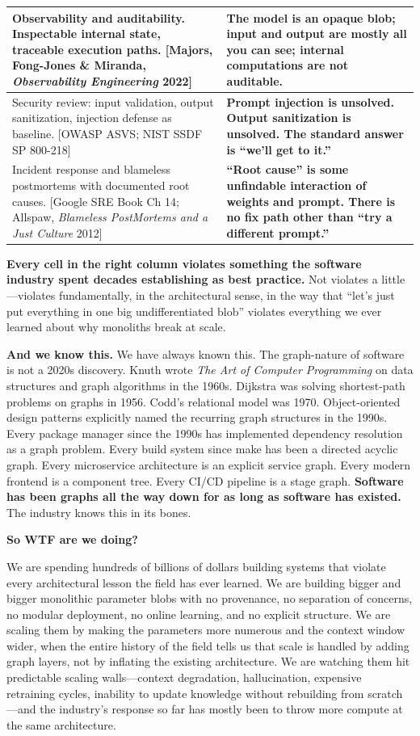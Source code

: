 \documentclass[11pt]{article}
\begin{document}
\begin{longtable}{|p{}|p{}|}
\hline
Observability and auditability. Inspectable internal state, traceable execution paths. [Majors, Fong-Jones \& Miranda, \emph{Observability Engineering} 2022] & \textbf{The model is an opaque blob; input and output are mostly all you can see; internal computations are not auditable.} \\
\hline
Security review: input validation, output sanitization, injection defense as baseline. [OWASP ASVS; NIST SSDF SP 800-218] & \textbf{Prompt injection is unsolved. Output sanitization is unsolved. The standard answer is ``we'll get to it.''} \\
\hline
Incident response and blameless postmortems with documented root causes. [Google SRE Book Ch 14; Allspaw, \emph{Blameless PostMortems and a Just Culture} 2012] & \textbf{``Root cause'' is some unfindable interaction of weights and prompt. There is no fix path other than ``try a different prompt.''} \\
\hline
\end{longtable}

\textbf{Every cell in the right column violates something the software industry spent decades establishing as best practice.} Not violates a little---violates fundamentally, in the architectural sense, in the way that ``let's just put everything in one big undifferentiated blob'' violates everything we ever learned about why monoliths break at scale.

\textbf{And we know this.} We have always known this. The graph-nature of software is not a 2020s discovery. Knuth wrote \emph{The Art of Computer Programming} on data structures and graph algorithms in the 1960s. Dijkstra was solving shortest-path problems on graphs in 1956. Codd's relational model was 1970. Object-oriented design patterns explicitly named the recurring graph structures in the 1990s. Every package manager since the 1990s has implemented dependency resolution as a graph problem. Every build system since make has been a directed acyclic graph. Every microservice architecture is an explicit service graph. Every modern frontend is a component tree. Every CI/CD pipeline is a stage graph. \textbf{Software has been graphs all the way down for as long as software has existed.} The industry knows this in its bones.

\textbf{So WTF are we doing?}

We are spending hundreds of billions of dollars building systems that violate every architectural lesson the field has ever learned. We are building bigger and bigger monolithic parameter blobs with no provenance, no separation of concerns, no modular deployment, no online learning, and no explicit structure. We are scaling them by making the parameters more numerous and the context window wider, when the entire history of the field tells us that scale is handled by adding graph layers, not by inflating the existing architecture. We are watching them hit predictable scaling walls---context degradation, hallucination, expensive retraining cycles, inability to update knowledge without rebuilding from scratch---and the industry's response so far has mostly been to throw more compute at the same architecture.
\end{document}
